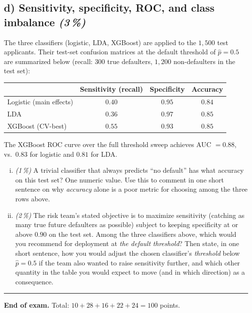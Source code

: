 \documentclass[11pt,a4paper]{article}
\newcommand{\subpoints}[1]{\textit{(#1\,\%)}}
\begin{document}
\subsection*{d) Sensitivity, specificity, ROC, and class imbalance \subpoints{3}}

The three classifiers (logistic, LDA, XGBoost) are applied to the $1{,}500$ test applicants. Their test-set confusion matrices at the default threshold of $\hat p = 0.5$ are summarized below (recall: $300$ true defaulters, $1{,}200$ non-defaulters in the test set):

\begin{center}\small
\begin{tabular}{lccc}
\toprule
                                   & \textbf{Sensitivity (recall)} & \textbf{Specificity} & \textbf{Accuracy} \\
\midrule
Logistic (main effects)            & $0.40$ & $0.95$ & $0.84$ \\
LDA                                & $0.36$ & $0.97$ & $0.85$ \\
XGBoost (CV-best)                  & $0.55$ & $0.93$ & $0.85$ \\
\bottomrule
\end{tabular}
\end{center}

The XGBoost ROC curve over the full threshold sweep achieves AUC $= 0.88$, vs.\ $0.83$ for logistic and $0.81$ for LDA.

\begin{enumerate}[(i)]
  \item \subpoints{1} A trivial classifier that always predicts ``no default'' has what accuracy on this test set? One numeric value. Use this to comment in one short sentence on why \emph{accuracy} alone is a poor metric for choosing among the three rows above.

  \item \subpoints{2} The risk team's stated objective is to maximize sensitivity (catching as many true future defaulters as possible) subject to keeping specificity at or above $0.90$ on the test set. Among the three classifiers above, which would you recommend for deployment at \emph{the default threshold}? Then state, in one short sentence, how you would adjust the chosen classifier's \emph{threshold} below $\hat p = 0.5$ if the team also wanted to raise sensitivity further, and which other quantity in the table you would expect to move (and in which direction) as a consequence.
\end{enumerate}

\vspace{1em}
\hrule
\vspace{0.5em}

\noindent\textbf{End of exam.} \quad Total: $10 + 28 + 16 + 22 + 24 = 100$ points.
\end{document}
